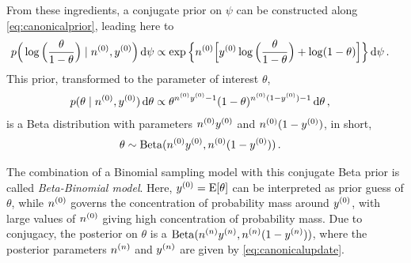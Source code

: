From these ingredients, a conjugate prior on $\psi$ can be constructed along \eqref{eq:canonicalprior},
leading here to
\begin{align*}
p\Big(\log\Big(\frac{\theta}{1-\theta}\Big) \mid \nz, \yz\Big) \dd\psi %
 &\propto \exp\Big\{ \nz \Big[ \yz \log\Big(\frac{\theta}{1-\theta}\Big) + \log(1-\theta) \Big] \Big\} \dd\psi\,.
\end{align*}
This prior, transformed to the parameter of interest $\theta$,
\begin{align*}
p(\theta\mid n^{(0)}, y^{(0)})\,\mathrm{d}\theta &\propto \theta^{n^{(0)}y^{(0)} - 1} (1-\theta)^{n^{(0)}(1-y^{(0)}) - 1} \,\mathrm{d}\theta\,,
\end{align*}
is a Beta distribution with parameters $n^{(0)}y^{(0)}$ and $n^{(0)}(1-y^{(0)})$, in short, %
\begin{align*}
\theta &\sim \operatorname{Beta}(n^{(0)}y^{(0)}, n^{(0)}(1-y^{(0)}))\,.
\end{align*}

The combination of a Binomial sampling model with this conjugate Beta prior is called \emph{Beta-Binomial model}.
Here, $y^{(0)} = \operatorname{E}[\theta]$ can be interpreted as prior guess of $\theta$,
while $n^{(0)}$ governs the concentration of probability mass around $y^{(0)}$,
with large values of $n^{(0)}$ giving high concentration of probability mass.
Due to conjugacy, the posterior on $\theta$ is a $\operatorname{Beta}(n^{(n)}y^{(n)}, n^{(n)}(1-y^{(n)}))$,
where the posterior parameters $n^{(n)}$ and $y^{(n)}$ are given by \eqref{eq:canonicalupdate}.

